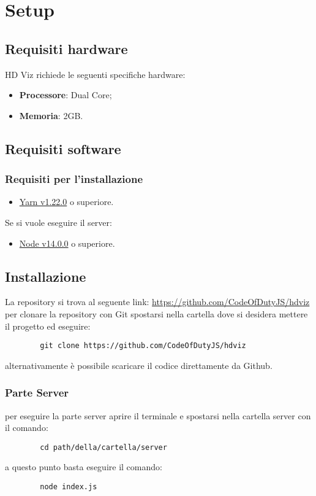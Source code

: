 \section{Setup}
    \subsection{Requisiti hardware}
    HD Viz richiede le seguenti specifiche hardware:
    \begin{itemize}
        \item \textbf{Processore}: Dual Core;
        \item \textbf{Memoria}: 2GB.
    \end{itemize}
    \subsection{Requisiti software}
        \subsubsection{Requisiti per l'installazione}
        \begin{itemize}
            \item \href{https://yarnpkg.com/}{Yarn v1.22.0} o superiore.
        \end{itemize}
        Se si vuole eseguire il server:
        \begin{itemize}
            \item \href{https://nodejs.org/en/}{Node v14.0.0} o superiore.
        \end{itemize}
    \subsection{Installazione}
    La repository si trova al seguente link:
    \href{https://github.com/CodeOfDutyJS/hdviz}{https://github.com/CodeOfDutyJS/hdviz}
    \\
    per clonare la repository con Git spostarsi nella cartella dove si desidera mettere il progetto ed eseguire:
    \begin{verbatim}
        git clone https://github.com/CodeOfDutyJS/hdviz
    \end{verbatim}
    alternativamente è possibile scaricare il codice direttamente da Github.
        \subsubsection{Parte Server}
        per eseguire la parte server aprire il terminale e spostarsi nella cartella server con il comando:
        \begin{verbatim}
        cd path/della/cartella/server
        \end{verbatim}
        a questo punto basta eseguire il comando:
        \begin{verbatim}
        node index.js
        \end{verbatim}
